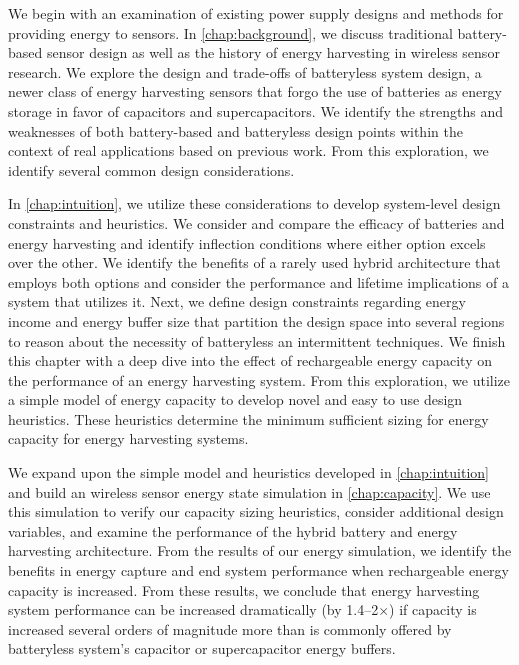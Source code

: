 We begin with an examination of existing power supply designs and methods for providing energy to sensors. In \cref{chap:background}, we discuss traditional battery-based sensor design as well as the history of energy harvesting in wireless sensor research.
We explore the design and trade-offs of batteryless system design, a newer class of energy harvesting sensors that forgo the use of batteries as energy storage in favor of capacitors and supercapacitors.
We identify the strengths and weaknesses of both battery-based and batteryless design points within the context of real applications based on previous work.
From this exploration, we identify several common design considerations.

In \cref{chap:intuition}, we utilize these considerations to develop system-level design constraints and heuristics.
We consider and compare the efficacy of batteries and energy harvesting and identify inflection conditions where either option excels over the other. We identify the benefits of a rarely used hybrid architecture that employs both options and consider the performance and lifetime implications of a system that utilizes it.
Next, we define design constraints regarding energy income and energy buffer size that partition the design space into several regions to reason about the necessity of batteryless an intermittent techniques. 
We finish this chapter with a deep dive into the effect of rechargeable energy capacity on the performance of an energy harvesting system. From this exploration, we utilize a simple model of energy capacity to develop novel and easy to use design heuristics. These heuristics determine the minimum sufficient sizing for energy capacity for energy harvesting systems. 

We expand upon the simple model and heuristics developed in \cref{chap:intuition} and build an wireless sensor energy state simulation in \cref{chap:capacity}.
We use this simulation to verify our capacity sizing heuristics, consider additional design variables, and examine the performance of the hybrid battery and energy harvesting architecture.
From the results of our energy simulation, we identify the benefits in energy capture and end system performance when rechargeable energy capacity is increased. From these results, we conclude that energy harvesting system performance can be increased dramatically (by 1.4--2$\times$) if capacity is increased several orders of magnitude more than is commonly offered by batteryless system's capacitor or supercapacitor energy buffers. 

